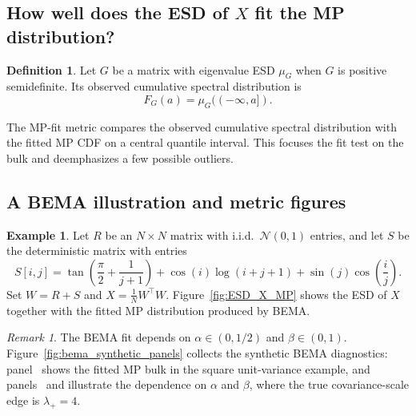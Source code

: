 \documentclass[11pt]{article}
\theoremstyle{plain}
\theoremstyle{definition}
\newtheorem{defn}[thm]{Definition}
\newtheorem{ex}[thm]{Example}
\theoremstyle{remark}
\newtheorem{rem}[thm]{Remark}
\newcommand{\1}{\mathbf{1}}
\begin{document}
\subsection{How well does the ESD of \texorpdfstring{\(X\)}{X} fit the MP distribution?}
\label{Alignment_Evaluation}

\begin{defn}
\label{ECS_Reformulated}
Let \(G\) be a matrix with eigenvalue ESD \(\mu_G\) when \(G\) is positive semidefinite. Its observed cumulative spectral distribution is
\[
F_G(a)=\mu_G((-\infty,a]).
\]
\end{defn}

The MP-fit metric compares the observed cumulative spectral distribution with the fitted MP CDF on a central quantile interval. This focuses the fit test on the bulk and deemphasizes a few possible outliers.

\subsection{A BEMA illustration and metric figures}
\label{alpha_and_metrics}

\begin{ex}
\label{deterministic_random}
Let \(R\) be an \(N\times N\) matrix with i.i.d.\ \(\mathcal N(0,1)\) entries, and let \(S\) be the deterministic matrix with entries
\[
S[i,j]=\tan\!\left(\frac{\pi}{2}+\frac{1}{j+1}\right)+\cos(i)\log(i+j+1)+\sin(j)\cos\!\left(\frac{i}{j}\right).
\]
Set \(W=R+S\) and \(X=\frac1N W^\top W\). Figure~\ref{fig:ESD_X_MP} shows the ESD of \(X\) together with the fitted MP distribution produced by BEMA.
\end{ex}

\begin{rem}
\label{alpha_hyper}
The BEMA fit depends on \(\alpha\in(0,1/2)\) and \(\beta\in(0,1)\). Figure~\ref{fig:bema_synthetic_panels} collects the synthetic BEMA diagnostics: panel~ shows the fitted MP bulk in the square unit-variance example, and panels~ and  illustrate the dependence on \(\alpha\) and \(\beta\), where the true covariance-scale edge is \(\lambda_+=4\).
\end{rem}
\end{document}
